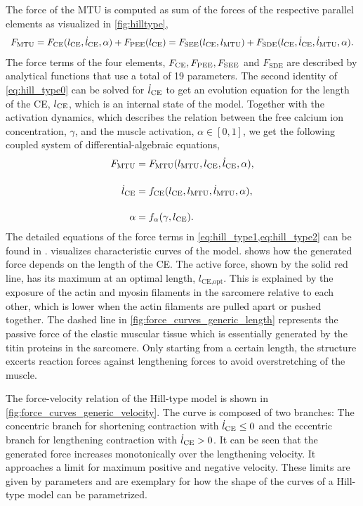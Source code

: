 The force of the MTU is computed as sum of the forces of the respective parallel elements as visualized in \cref{fig:hilltype},
\begin{equation}\label{eq:hill_type0}
  \begin{array}{lll}
    F_{\text{MTU}} = F_{\text{CE}}(l_{\text{CE}}, \dot{l}_{\text{CE}}, \alpha) + F_\text{PEE}(l_{\text{CE}}) = F_\text{SEE}(l_{\text{CE}},l_{\text{MTU}}) + F_\text{SDE}(l_{\text{CE}},\dot{l}_{\text{CE}},\dot{l}_{\text{MTU}},\alpha).
  \end{array}
\end{equation}
The force terms of the four elements, $F_{\text{CE}}, F_\text{PEE}, F_\text{SEE}$ and $F_\text{SDE}$ are described by analytical functions that use a total of 19 parameters. The second identity of \eqref{eq:hill_type0} can be solved for $\dot{l}_{\text{CE}}$ to get an evolution equation for the length of the CE, $l_{\text{CE}}$, which is an internal state of the model. Together with the activation dynamics, which describes the relation between the free calcium ion concentration, $\gamma$, and the muscle activation, $\alpha \in [0,1]$, we get the following coupled system of differential-algebraic equations,
\begin{align}
  F_{\text{MTU}} &= F_{\text{MTU}}(l_{\text{MTU}},l_{\text{CE}},\dot{l}_{\text{CE}},\alpha),      \label{eq:hill_type1} \\[4mm]
  \dot{l}_{\text{CE}} &= f_{\text{CE}}(l_{\text{CE}},l_{\text{MTU}},\dot{l}_{\text{MTU}},\alpha), \label{eq:hill_type2}\\[4mm]
  \alpha &= f_\alpha(\gamma, l_{\text{CE}}).                      \label{eq:hill_type3}
\end{align}
The detailed equations of the force terms in \cref{eq:hill_type1,eq:hill_type2} can be found in \cite{Hilltype2014}.  visualizes characteristic curves of the model.  shows how the generated force depends on the length of the CE. The active force, shown by the solid red line, has its maximum at an optimal length, $l_\text{CE,opt}$. This is explained by the exposure of the actin and myosin filaments in the sarcomere relative to each other, which is lower when the actin filaments are pulled apart or pushed together.
The dashed line in \cref{fig:force_curves_generic_length} represents the passive force of the elastic muscular tissue which is essentially generated by the titin proteins in the sarcomere. Only starting from a certain length, the structure excerts reaction forces against lengthening forces to avoid overstretching of the muscle.

The force-velocity relation of the Hill-type model is shown in \cref{fig:force_curves_generic_velocity}. The curve is composed of two branches: 
The concentric branch for shortening contraction with $\dot{l}_{\text{CE}} \leq 0$ and the eccentric branch for lengthening contraction with $\dot{l}_{\text{CE}} > 0$. It can be seen that the generated force increases monotonically over the lengthening velocity. It approaches a limit for maximum positive and negative velocity. These limits are given by parameters and are exemplary for how the shape of the curves of a Hill-type model can be parametrized.

